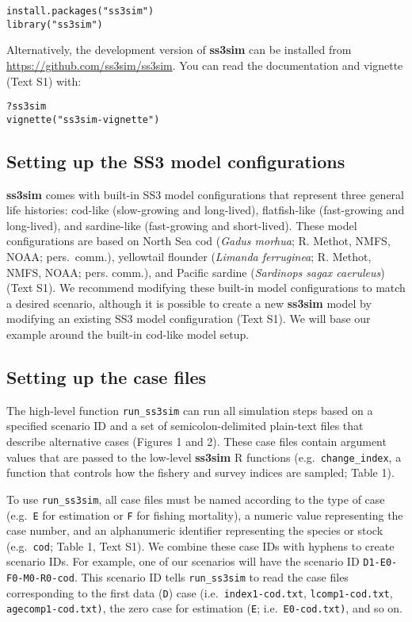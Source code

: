 \begin{verbatim}
install.packages("ss3sim")
library("ss3sim")
\end{verbatim}

\noindent
Alternatively, the development version of \textbf{ss3sim} can be installed from
\url{https://github.com/ss3sim/ss3sim}. You can read the documentation and
vignette (Text S1) with:

\begin{verbatim}
?ss3sim
vignette("ss3sim-vignette")
\end{verbatim}

\subsection*{Setting up the SS3 model configurations}

\textbf{ss3sim} comes with built-in SS3 model configurations that represent
three general life histories: cod-like (slow-growing and long-lived),
flatfish-like (fast-growing and long-lived), and sardine-like (fast-growing and
short-lived). These model configurations are based on North Sea cod
(\emph{Gadus morhua}; R. Methot, NMFS, NOAA; pers.~comm.), yellowtail flounder
(\emph{Limanda ferruginea}; R. Methot, NMFS, NOAA; pers. comm.), and Pacific
sardine (\emph{Sardinops sagax caeruleus}) \cite{hill2012} (Text S1). We
recommend modifying these built-in model configurations to match a desired
scenario, although it is possible to create a new \textbf{ss3sim} model by
modifying an existing SS3 model configuration (Text S1). We will base our
example around the built-in cod-like model setup.

\subsection*{Setting up the case files}

The high-level function \texttt{run\_ss3sim} can run all simulation steps based
on a specified scenario ID and a set of semicolon-delimited plain-text files
that describe alternative cases (Figures 1 and 2). These case files
contain argument values that are passed to the low-level \textbf{ss3sim}
\textsf{R} functions (e.g.~\texttt{change\_index}, a function that controls how
the fishery and survey indices are sampled; Table 1).

To use \texttt{run\_ss3sim}, all case files must be named according to the type
of case (e.g.~\texttt{E} for estimation or \texttt{F} for fishing mortality), a
numeric value representing the case number, and an alphanumeric identifier
representing the species or stock (e.g.~\texttt{cod}; Table 1, Text S1). We
combine these case IDs with hyphens to create scenario IDs. For example, one of
our scenarios will have the scenario ID \texttt{D1-E0-F0-M0-R0-cod}. This
scenario ID tells \texttt{run\_ss3sim} to read the case files corresponding to
the first data (\texttt{D}) case (i.e.~\texttt{index1-cod.txt},
\texttt{lcomp1-cod.txt}, \texttt{agecomp1-cod.txt)}, the zero case for
estimation (\texttt{E}; i.e.~\texttt{E0-cod.txt)}, and so on.

